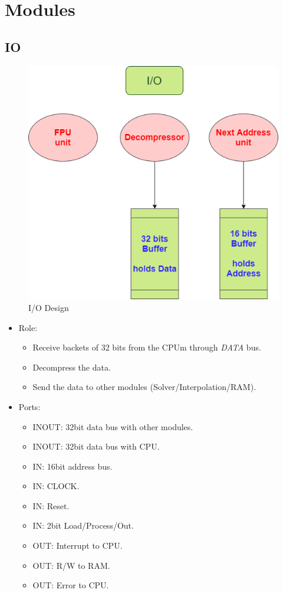 \documentclass[12pt]{extarticle}
\begin{document}
\section{Modules}

\subsection{IO}

\begin{figure}[hp]
    \centering
    \includegraphics[width=\textwidth]{IO}
    \caption{I/O Design}
    \label{fig:io}
\end{figure}

\begin{itemize}
    \item Role:
    \begin{itemize}
        \item Receive backets of 32 bits from the CPUm through \emph{DATA} bus.
        \item Decompress the data.
        \item Send the data to other modules (Solver/Interpolation/RAM).
    \end{itemize}
    \item Ports:
    \begin{itemize}
        \item INOUT: 32bit data bus with other modules.
        \item INOUT: 32bit data bus with CPU.
        \item IN: 16bit address bus.
        \item IN: CLOCK.
        \item IN: Reset.
        \item IN: 2bit Load/Process/Out.
        \item OUT: Interrupt to CPU.
        \item OUT: R/W to RAM.
        \item OUT: Error to CPU.
    \end{itemize}
\end{itemize}
\end{document}
